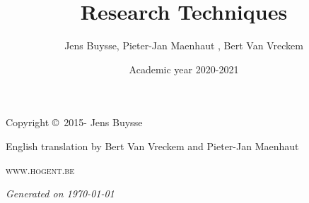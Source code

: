 \documentclass{hogent-report}
\title{Research Techniques}
\author{Jens Buysse, Pieter-Jan Maenhaut , Bert {Van Vreckem}}
\date{Academic year 2020-2021}
\begin{document}


\newpage

\thispagestyle{empty}

\vspace*{20cm}

\noindent Copyright \copyright\ 2015-{\the\year} Jens Buysse %

\noindent English translation by Bert Van Vreckem and Pieter-Jan Maenhaut

\noindent \textsc{www.hogent.be} %

\noindent \textit{Generated on \today} %



\usechapterimagefalse
\tableofcontents %

\cleardoublepage %

\def\R{\mathbb{R}}








 



\begin{appendices}
    
    
    
    \clearpage
    \printbibliography
    
    \clearpage
    \printindex
    
\end{appendices}
\end{document}
